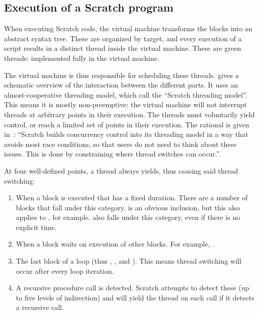 \documentclass[../main]{subfiles}
\begin{document}
\subsection{Execution of a Scratch program}\label{subsec:execution-of-a-scratch-program}

When executing Scratch code, the virtual machine transforms the blocks into an abstract syntax tree.
These are organized by target, and every execution of a script results in a distinct thread inside the virtual machine.
These are green threads: implemented fully in the virtual machine.

The virtual machine is thus responsible for scheduling these threads.
 gives a schematic overview of the interaction between the different parts.
It uses an almost-cooperative threading model, which \textcite{maloneyScratchProgrammingLanguage2010} call the ``Scratch threading model''.
This means it is mostly non-preemptive: the virtual machine will not interrupt threads at arbitrary points in their execution.
The threads must voluntarily yield control, or reach a limited set of points in their execution.
The rational is given in~\cite{maloneyScratchProgrammingLanguage2010}: ``Scratch builds concurrency control into its threading model in a way that avoids most race conditions, so that users do not need to think about these issues.
This is done by constraining where thread switches can occur.''.

At four well-defined points, a thread always yields, thus causing said thread switching:
\begin{enumerate}
    \item When a block is executed that has a fixed duration.
        There are a number of blocks that fall under this category.
         is an obvious inclusion, but this also applies to , for example.
         also falls under this category, even if there is no explicit time.
    \item When a block waits on execution of other blocks.
        For example, .
    \item The last block of a loop (thus , , and ).
        This means thread switching will occur after every loop iteration.
    \item A recursive procedure call is detected.
        Scratch attempts to detect these (up to five levels of indirection) and will yield the thread on each call if it detects a recursive call.
\end{enumerate}
\end{document}
